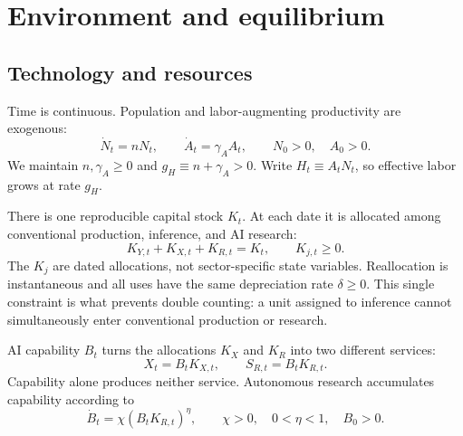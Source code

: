 \section{Environment and equilibrium}
\label{sec:model}

\subsection{Technology and resources}

Time is continuous. Population and labor-augmenting productivity are exogenous:
\begin{equation}
 \dot N_t=nN_t,\qquad \dot A_t=\gamma_A A_t,
 \qquad N_0>0,\quad A_0>0.
 \label{eq:AN}
\end{equation}
We maintain $n,\gamma_A\geq0$ and $g_H\equiv n+\gamma_A>0$.
Write $H_t\equiv A_tN_t$, so effective labor grows at rate $g_H$.

There is one reproducible capital stock $K_t$. At each date it is allocated among conventional production, inference, and AI research:
\begin{equation}
 K_{Y,t}+K_{X,t}+K_{R,t}=K_t,\qquad K_{j,t}\geq 0.
 \label{eq:capital-allocation}
\end{equation}
The $K_j$ are dated allocations, not sector-specific state variables. Reallocation is instantaneous and all uses have the same depreciation rate $\delta\geq0$. This single constraint is what prevents double counting: a unit assigned to inference cannot simultaneously enter conventional production or research.

AI capability $B_t$ turns the allocations $K_X$ and $K_R$ into two different services:
\begin{equation}
 X_t=B_tK_{X,t},\qquad S_{R,t}=B_tK_{R,t}.
 \label{eq:AI-services}
\end{equation}
Capability alone produces neither service. Autonomous research accumulates capability according to
\begin{equation}
 \dot B_t=\chi(B_tK_{R,t})^\eta,\qquad
 \chi>0,\quad 0<\eta<1,\quad B_0>0.
 \label{eq:B-law}
\end{equation}

